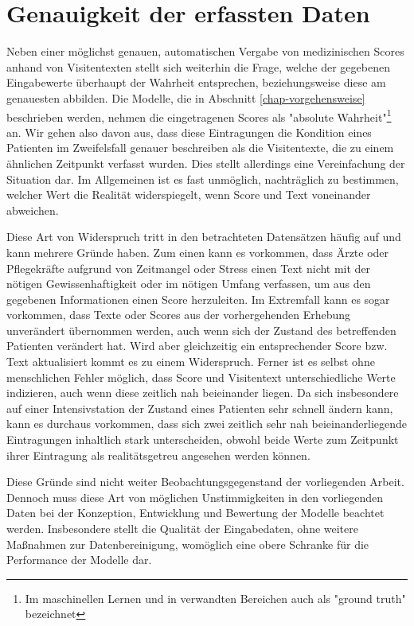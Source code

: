 \section{Genauigkeit der erfassten Daten}\label{section:genauigkeit_der_daten}
Neben einer möglichst genauen, automatischen Vergabe von medizinischen Scores anhand von Visitentexten stellt sich weiterhin die Frage, welche der gegebenen Eingabewerte überhaupt der Wahrheit entsprechen, beziehungsweise diese am genauesten abbilden. Die Modelle, die in Abschnitt \ref{chap-vorgehensweise} beschrieben werden, nehmen die eingetragenen Scores als "absolute Wahrheit"\footnote{Im maschinellen Lernen und in verwandten Bereichen auch als "ground truth" bezeichnet} an. Wir gehen also davon aus, dass diese Eintragungen die Kondition eines Patienten im Zweifelsfall genauer beschreiben als die Visitentexte, die zu einem ähnlichen Zeitpunkt verfasst wurden. Dies stellt allerdings eine Vereinfachung der Situation dar. Im Allgemeinen ist es fast unmöglich, nachträglich zu bestimmen, welcher Wert die Realität widerspiegelt, wenn Score und Text voneinander abweichen. 

Diese Art von Widerspruch tritt in den betrachteten Datensätzen häufig auf und kann mehrere Gründe haben. Zum einen kann es vorkommen, dass Ärzte oder Pflegekräfte aufgrund von Zeitmangel oder Stress einen Text nicht mit der nötigen Gewissenhaftigkeit oder im nötigen Umfang verfassen, um aus den gegebenen Informationen einen Score herzuleiten. Im Extremfall kann es sogar vorkommen, dass Texte oder Scores aus der vorhergehenden Erhebung unverändert übernommen werden, auch wenn sich der Zustand des betreffenden Patienten verändert hat. Wird aber gleichzeitig ein entsprechender Score bzw. Text aktualisiert kommt es zu einem Widerspruch. Ferner ist es selbst ohne menschlichen Fehler möglich, dass Score und Visitentext unterschiedliche Werte indizieren, auch wenn diese zeitlich nah beieinander liegen. Da sich insbesondere auf einer Intensivstation der Zustand eines Patienten sehr schnell ändern kann, kann es durchaus vorkommen, dass sich zwei zeitlich sehr nah beieinanderliegende Eintragungen inhaltlich stark unterscheiden, obwohl beide Werte zum Zeitpunkt ihrer Eintragung als realitätsgetreu angesehen werden können.

Diese Gründe sind nicht weiter Beobachtungsgegenstand der vorliegenden Arbeit. Dennoch muss diese Art von möglichen Unstimmigkeiten in den vorliegenden Daten bei der Konzeption, Entwicklung und Bewertung der Modelle beachtet werden. Insbesondere stellt die Qualität der Eingabedaten, ohne weitere Maßnahmen zur Datenbereinigung, womöglich eine obere Schranke für die Performance der Modelle dar.